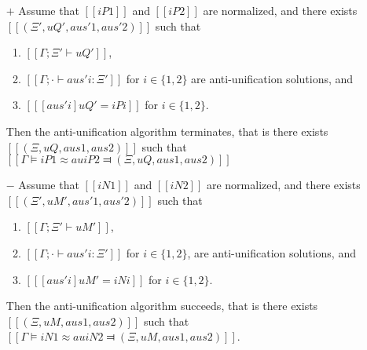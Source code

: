 


\begin{lemma} \label{lemma:anti-unification-completeness}
    \hfill
    \begin{itemize}
        \item [$+$] 
            Assume that $[[iP1]]$ and $[[iP2]]$ are normalized, and
            there exists $[[(Ξ', uQ', aus'1, aus'2)]]$ such that
            \begin{enumerate}
                \item $[[Γ ; Ξ' ⊢ uQ']]$,
                \item $[[Γ ; · ⊢ aus'i : Ξ']]$ for $i \in \{1,2\}$ 
                are anti-unification solutions, and
                \item $[[ [aus'i] uQ' = iPi ]]$ for $i \in \{1,2\}$.
            \end{enumerate}

            Then the anti-unification algorithm terminates, that is there exists
            $[[(Ξ, uQ, aus1, aus2)]]$ such that $[[Γ ⊨ iP1 ≈au iP2 ⫤ (Ξ, uQ, aus1, aus2)]]$

        \item [$-$] 
            Assume that $[[iN1]]$ and $[[iN2]]$ are normalized, and
            there exists $[[(Ξ', uM', aus'1, aus'2)]]$ such that
            \begin{enumerate}
                \item $[[Γ ; Ξ' ⊢ uM']]$,
                \item $[[Γ ; · ⊢ aus'i : Ξ']]$ for $i \in \{1,2\}$,
                are anti-unification solutions, and
                \item $[[ [aus'i] uM' = iNi ]]$ for $i \in \{1,2\}$.
            \end{enumerate}

            Then the anti-unification algorithm succeeds, that is 
            there exists $[[(Ξ, uM, aus1, aus2)]]$ such that
            $[[Γ ⊨ iN1 ≈au iN2 ⫤ (Ξ, uM, aus1, aus2)]]$.
    \end{itemize}
\end{lemma}
